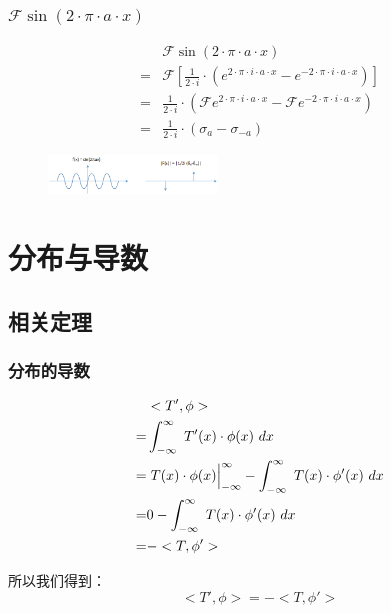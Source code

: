 \subsubsection{$\mathcal{F}\sin(2\cdot\pi\cdot a\cdot x)$}
\begin{align*}
	  & \mathcal{F}\sin(2\cdot\pi\cdot a\cdot x)                                                                                \\
	= & \mathcal{F}[\frac{1}{2\cdot i}\cdot(e^{2\cdot \pi\cdot i\cdot a\cdot x}-e^{-2\cdot \pi\cdot i\cdot a\cdot x})]          \\
	= & \frac{1}{2\cdot i}\cdot(\mathcal{F}e^{2\cdot \pi\cdot i\cdot a\cdot x}-\mathcal{F}e^{-2\cdot \pi\cdot i\cdot a\cdot x}) \\
	= & \frac{1}{2\cdot i}\cdot (\sigma_a-\sigma_{-a})
\end{align*}
\begin{figure}[H]
	\centering
	\includegraphics[width=0.4\textwidth]{assets/fsin.png}
\end{figure}
\section{分布与导数}
\subsection{相关定理}
\subsubsection{分布的导数}
\begin{align*}
	  & <T',\phi>                                                                                \\
	= & \int_{-\infty}^{\infty}\ T'(x)\cdot \phi(x)\ dx                                          \\
	= & \rsx{T(x)\cdot \phi(x)}_{-\infty}^\infty-\int_{-\infty}^{\infty}\ T(x)\cdot \phi'(x)\ dx \\
	= & 0-\int_{-\infty}^{\infty}\ T(x)\cdot \phi'(x)\ dx                                        \\
	= & -<T,\phi'>
\end{align*}

所以我们得到：
\begin{equation}
	<T',\phi>=-<T,\phi'>
\end{equation}

